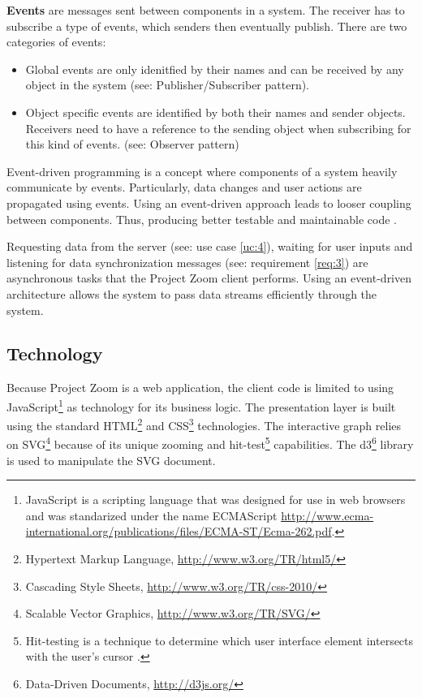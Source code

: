 \textbf{Events} are messages sent between components in a system. The receiver has to subscribe a type of events, which senders then eventually publish. There are two categories of events:
\begin{itemize}
\item Global events are only idenitfied by their names and can be received by any object in the system (see: Publisher/Subscriber pattern).
\item Object specific events are identified by both their names and sender objects. Receivers need to have a reference to the sending object when subscribing for this kind of events. (see: Observer pattern)
\end{itemize} 

Event-driven programming is a concept where components of a system heavily communicate by events. Particularly, data changes and user actions are propagated using events. Using an event-driven approach leads to looser coupling between components. Thus, producing better testable and maintainable code \cite{Faison_2011}. 

Requesting data from the server (see: use case \ref{uc:4}), waiting for user inputs and listening for data synchronization messages (see: requirement \ref{req:3}) are asynchronous tasks that the Project Zoom client performs. Using an event-driven architecture allows the system to pass data streams efficiently through the system.

\subsection{Technology}
Because Project Zoom is a web application, the client code is limited to using JavaScript\footnote{JavaScript is a scripting language that was designed for use in web browsers and was standarized under the name ECMAScript \url{http://www.ecma-international.org/publications/files/ECMA-ST/Ecma-262.pdf}.} as technology for its business logic. The presentation layer is built using the standard HTML\footnote{Hypertext Markup Language, \url{http://www.w3.org/TR/html5/}} and CSS\footnote{Cascading Style Sheets, \url{http://www.w3.org/TR/css-2010/}} technologies. The interactive graph relies on SVG\footnote{Scalable Vector Graphics, \url{http://www.w3.org/TR/SVG/}} because of its unique zooming and hit-test\footnote{Hit-testing is a technique to determine which user interface element intersects with the user's cursor \cite{Foley_1995}.} capabilities. The d3\footnote{Data-Driven Documents, \url{http://d3js.org/}} library is used to manipulate the SVG document.

